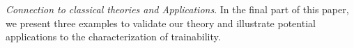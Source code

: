 \documentclass[%
 superscriptaddress,
 aps,prl,
 reprint,
 twocolumn,
 amsmath,amssymb,showpacs,
 bibnotes,
]{revtex4-2}
\newtheorem{proposition}{Proposition}
\newcommand{\RomanNumeralCaps}[1]
    {\MakeUppercase{\romannumeral #1}}
\newcommand*{\dif}{\mathop{}\!\mathrm{d}}
\begin{document}
\emph{\label{sec:5} Connection to classical theories and Applications}.
In the final part of this paper, we present three examples to validate our theory and illustrate potential applications to the characterization of trainability.
\end{document}
